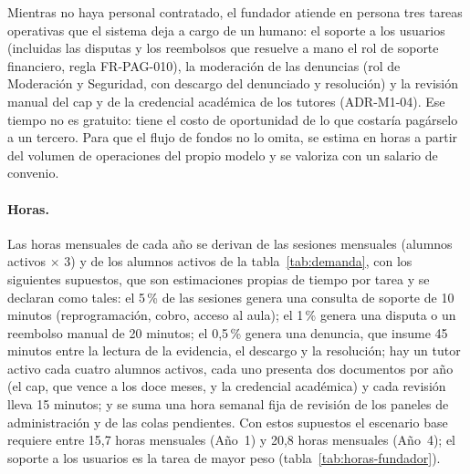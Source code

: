 Mientras no haya personal contratado, el fundador atiende en persona
tres tareas operativas que el sistema deja a cargo de un humano: el
soporte a los usuarios (incluidas las disputas y los reembolsos que
resuelve a mano el rol de soporte financiero, regla FR-PAG-010), la
moderación de las denuncias (rol de Moderación y Seguridad, con descargo
del denunciado y resolución) y la revisión manual del \gls{cap} y de la
credencial académica de los tutores (ADR-M1-04). Ese tiempo no es
gratuito: tiene el costo de oportunidad de lo que costaría pagárselo a
un tercero. Para que el flujo de fondos no lo omita, se estima en horas
a partir del volumen de operaciones del propio modelo y se valoriza con
un salario de convenio.

\paragraph{Horas.} Las horas mensuales de cada año se derivan de las
sesiones mensuales (alumnos activos $\times$ 3) y de los alumnos activos
de la tabla~\ref{tab:demanda}, con los siguientes supuestos, que son
estimaciones propias de tiempo por tarea y se declaran como tales: el
5\,\% de las sesiones genera una consulta de soporte de 10 minutos
(reprogramación, cobro, acceso al aula); el 1\,\% genera una disputa o un
reembolso manual de 20 minutos; el 0,5\,\% genera una denuncia, que
insume 45 minutos entre la lectura de la evidencia, el descargo y la
resolución; hay un tutor activo cada cuatro alumnos activos, cada uno
presenta dos documentos por año (el \gls{cap}, que vence a los doce
meses, y la credencial académica) y cada revisión lleva 15 minutos; y se
suma una hora semanal fija de revisión de los paneles de administración y
de las colas pendientes. Con estos supuestos el escenario base requiere
entre 15,7 horas mensuales (Año~1) y 20,8 horas mensuales (Año~4); el
soporte a los usuarios es la tarea de mayor peso (tabla~\ref{tab:horas-fundador}).

